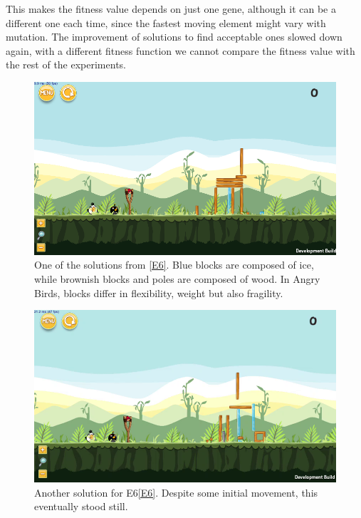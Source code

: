 \documentclass[a4paper,twoside]{article}
\begin{document}
This makes the fitness value depends on just one gene, although it can be a
different one each time, since the fastest moving element might vary
with mutation. The improvement of solutions to find acceptable ones
slowed down 
again, with a different fitness function we cannot compare the fitness
value with the rest of the experiments. 
%
\begin{figure}
 	\centering
 	\includegraphics[scale=0.35]{E6.png}
 	\caption{One of the solutions from \ref{E6}. Blue blocks are
          composed of ice, while brownish blocks and poles are
          composed of wood. In Angry Birds, blocks differ in
          flexibility, weight but also fragility.}\label{f:e6}
\end{figure}
%
\begin{figure}
 	\centering
 	\includegraphics[scale=0.25]{Images/e6-2.png}
 	\caption{Another solution for E6\ref{E6}. Despite some initial
        movement, this eventually stood still.}\label{f:e6:2}
 \end{figure}
\end{document}
